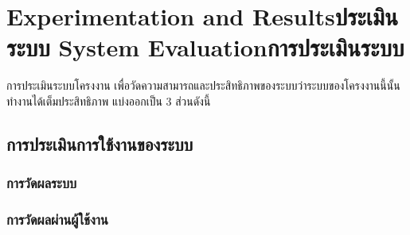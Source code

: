\chapter{\ifproject%
\ifenglish Experimentation and Results\else ประเมินระบบ\fi
\else%
\ifenglish System Evaluation\else การประเมินระบบ\fi
\fi}

\hspace{0.5in} การประเมินระบบโครงงาน เพื่อวัดความสามารถและประสิทธิภาพของระบบว่าระบบของโครงงานนี้นั้นทำงานได้เต็มประสิทธิภาพ แบ่งออกเป็น 3 ส่วนดังนี้

\section{การประเมินการใช้งานของระบบ}


\subsection{การวัดผลระบบ}
\subsection{การวัดผลผ่านผู้ใช้งาน}

